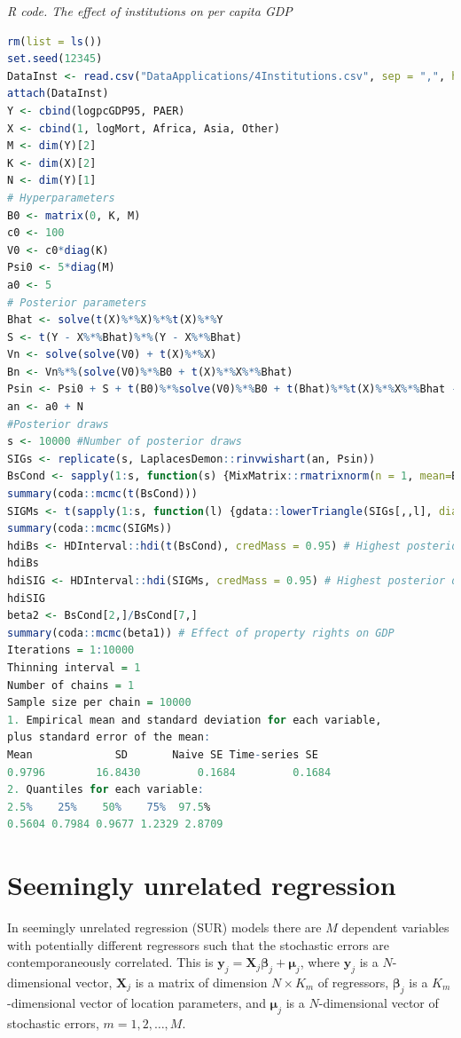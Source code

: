 \begin{tcolorbox}[enhanced,width=4.67in,center upper,
	fontupper=\large\bfseries,drop shadow southwest,sharp corners]
	\textit{R code. The effect of institutions on per capita GDP}
	\begin{VF}
		\begin{lstlisting}[language=R]
rm(list = ls())
set.seed(12345)
DataInst <- read.csv("DataApplications/4Institutions.csv", sep = ",", header = TRUE, fileEncoding = "latin1")
attach(DataInst)
Y <- cbind(logpcGDP95, PAER)
X <- cbind(1, logMort, Africa, Asia, Other)
M <- dim(Y)[2]
K <- dim(X)[2]
N <- dim(Y)[1]
# Hyperparameters
B0 <- matrix(0, K, M)
c0 <- 100
V0 <- c0*diag(K)
Psi0 <- 5*diag(M)
a0 <- 5
# Posterior parameters
Bhat <- solve(t(X)%*%X)%*%t(X)%*%Y 
S <- t(Y - X%*%Bhat)%*%(Y - X%*%Bhat)
Vn <- solve(solve(V0) + t(X)%*%X) 
Bn <- Vn%*%(solve(V0)%*%B0 + t(X)%*%X%*%Bhat)
Psin <- Psi0 + S + t(B0)%*%solve(V0)%*%B0 + t(Bhat)%*%t(X)%*%X%*%Bhat - t(Bn)%*%solve(Vn)%*%Bn
an <- a0 + N
#Posterior draws
s <- 10000 #Number of posterior draws
SIGs <- replicate(s, LaplacesDemon::rinvwishart(an, Psin))
BsCond <- sapply(1:s, function(s) {MixMatrix::rmatrixnorm(n = 1, mean=Bn, U = Vn,V = SIGs[,,s])})
summary(coda::mcmc(t(BsCond)))
SIGMs <- t(sapply(1:s, function(l) {gdata::lowerTriangle(SIGs[,,l], diag=TRUE, byrow=FALSE)}))
summary(coda::mcmc(SIGMs))
hdiBs <- HDInterval::hdi(t(BsCond), credMass = 0.95) # Highest posterior density credible interval
hdiBs
hdiSIG <- HDInterval::hdi(SIGMs, credMass = 0.95) # Highest posterior density credible interval
hdiSIG
beta2 <- BsCond[2,]/BsCond[7,] 
summary(coda::mcmc(beta1)) # Effect of property rights on GDP
Iterations = 1:10000
Thinning interval = 1 
Number of chains = 1 
Sample size per chain = 10000 
1. Empirical mean and standard deviation for each variable,
plus standard error of the mean:
Mean             SD       Naive SE Time-series SE 
0.9796        16.8430         0.1684         0.1684 
2. Quantiles for each variable:
2.5%    25%    50%    75%  97.5% 
0.5604 0.7984 0.9677 1.2329 2.8709 
\end{lstlisting}
	\end{VF}
\end{tcolorbox} 

\section{Seemingly unrelated regression}\label{sec72}

In seemingly unrelated regression (SUR) models there are $M$ dependent variables with potentially different regressors such that the stochastic errors are contemporaneously correlated. This is $\bm{y}_{j}=\bm{X}_{j}\bm{\beta}_j+\bm{\mu}_{j}$, where $\bm{y}_j$ is a $N$-dimensional vector, $\bm{X}_j$ is a matrix of dimension $N\times K_m$ of regressors, $\bm{\beta}_j$ is a $K_m$-dimensional vector of location parameters, and $\bm{\mu}_j$ is a $N$-dimensional vector of stochastic errors, $m=1,2,\dots,M$.
	
